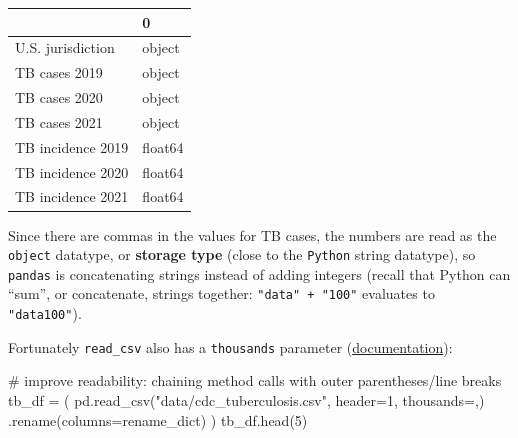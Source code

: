 \documentclass[
  letterpaper,
  DIV=11,
  numbers=noendperiod]{scrreprt}
\newenvironment{Shaded}{\begin{snugshade}}{\end{snugshade}}
\newcommand{\CommentTok}[1]{\textcolor[rgb]{0.37,0.37,0.37}{#1}}
\newcommand{\DecValTok}[1]{\textcolor[rgb]{0.68,0.00,0.00}{#1}}
\newcommand{\NormalTok}[1]{\textcolor[rgb]{0.00,0.23,0.31}{#1}}
\newcommand{\OperatorTok}[1]{\textcolor[rgb]{0.37,0.37,0.37}{#1}}
\newcommand{\StringTok}[1]{\textcolor[rgb]{0.13,0.47,0.30}{#1}}
\begin{document}
\begin{tabular}{ll}
\toprule
{} &        0 \\
\midrule
U.S. jurisdiction &   object \\
TB cases 2019     &   object \\
TB cases 2020     &   object \\
TB cases 2021     &   object \\
TB incidence 2019 &  float64 \\
TB incidence 2020 &  float64 \\
TB incidence 2021 &  float64 \\
\bottomrule
\end{tabular}

Since there are commas in the values for TB cases, the numbers are read
as the \texttt{object} datatype, or \textbf{storage type} (close to the
\texttt{Python} string datatype), so \texttt{pandas} is concatenating
strings instead of adding integers (recall that Python can ``sum'', or
concatenate, strings together: \texttt{"data"\ +\ "100"} evaluates to
\texttt{"data100"}).

Fortunately \texttt{read\_csv} also has a \texttt{thousands} parameter
(\href{https://pandas.pydata.org/docs/reference/api/pandas.read_csv.html}{documentation}):

\begin{Shaded}
\begin{Highlighting}[]
\CommentTok{\# improve readability: chaining method calls with outer parentheses/line breaks}
\NormalTok{tb\_df }\OperatorTok{=}\NormalTok{ (}
\NormalTok{    pd.read\_csv(}\StringTok{"data/cdc\_tuberculosis.csv"}\NormalTok{, header}\OperatorTok{=}\DecValTok{1}\NormalTok{, thousands}\OperatorTok{=}\StringTok{\textquotesingle{},\textquotesingle{}}\NormalTok{)}
\NormalTok{    .rename(columns}\OperatorTok{=}\NormalTok{rename\_dict)}
\NormalTok{)}
\NormalTok{tb\_df.head(}\DecValTok{5}\NormalTok{)}
\end{Highlighting}
\end{Shaded}
\end{document}

